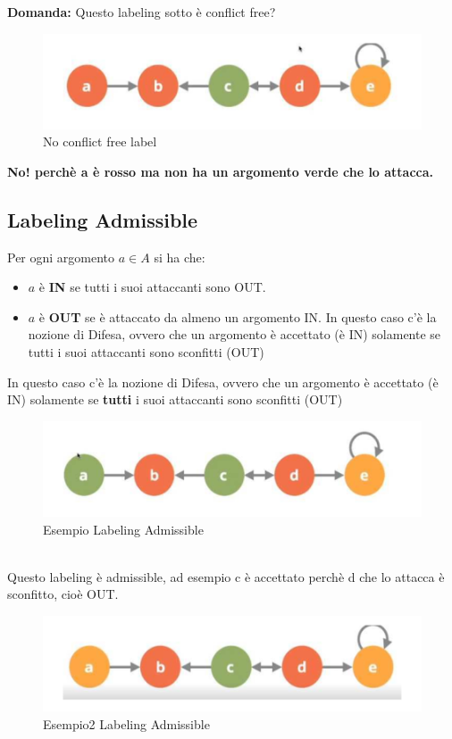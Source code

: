 \newpage
\textbf{Domanda: } Questo labeling sotto è conflict free?
\begin{figure}[htp]
	\centering
    \includegraphics[width=12cm, keepaspectratio]{img/Cap7/CF3.png}
    \caption{No conflict free label}
\end{figure}
\begin{center}
    \textbf{No! perchè a è rosso ma non ha un argomento verde che lo attacca.}
\end{center}
\newpage
\subsection{Labeling Admissible}
Per ogni argomento $a \in A$ si ha che:
\begin{itemize}
    \item $a$ è \textbf{IN} se tutti i suoi attaccanti sono OUT.
    \item $a$ è \textbf{OUT} se è attaccato da almeno un argomento IN. In questo caso c’è la nozione di Difesa, ovvero che un argomento è accettato (è IN) solamente se tutti i suoi attaccanti sono sconfitti (OUT)
\end{itemize}
In questo caso c’è la nozione di Difesa, ovvero che un argomento è accettato (è IN) solamente se \textbf{tutti} i suoi attaccanti sono sconfitti (OUT)
\begin{figure}[htp]
	\centering
    \includegraphics[width=12cm, keepaspectratio]{img/Cap7/LA.png}
    \caption{Esempio Labeling Admissible}
\end{figure}
\\Questo labeling è admissible, ad esempio c è accettato perchè d che lo attacca è sconfitto, cioè OUT.
\begin{figure}[htp]
	\centering
    \includegraphics[width=12cm, keepaspectratio]{img/Cap7/LA2.png}
    \caption{Esempio2 Labeling Admissible}
\end{figure}
